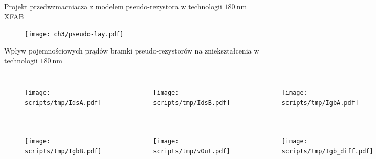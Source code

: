 \begin{frame}{Projekt przedwzmacniacza z modelem pseudo-rezystora w technologii $\SI{180}{\nano\metre}$  XFAB}
    \begin{figure}[H]
        \centering
        \texttt{[image: ch3/pseudo-lay.pdf]} 

    \end{figure}


\end{frame}

\begin{frame}{Wpływ pojemnościowych prądów bramki pseudo-rezystorów na zniekształcenia  w technologii $\SI{180}{\nano\metre}$}
    \vspace{-5mm} %

    \begin{columns}
        \begin{figure}[H]

            \texttt{[image: scripts/tmp/IdsA.pdf]}

        \end{figure}
        \begin{figure}[H]

            \texttt{[image: scripts/tmp/IdsB.pdf]}

        \end{figure}
        \begin{figure}[H]

            \texttt{[image: scripts/tmp/IgbA.pdf]}

        \end{figure}

    \end{columns}
    \vspace{-10mm} %
    \begin{columns}
        \begin{figure}[H]

            \texttt{[image: scripts/tmp/IgbB.pdf]}

        \end{figure}
        \begin{figure}[H]

            \texttt{[image: scripts/tmp/vOut.pdf]}

        \end{figure}
        \begin{figure}[H]

            \texttt{[image: scripts/tmp/Igb\_diff.pdf]}

        \end{figure}

    \end{columns}
        



\end{frame}


